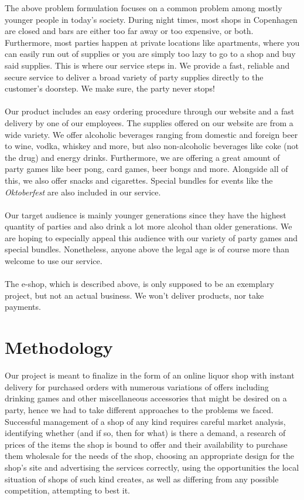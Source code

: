 \documentclass[12p]{article}
\begin{document}
The above problem formulation focuses on a common problem among mostly younger people in today's society. During night times, most shops in Copenhagen are closed and bars are either too far away or too expensive, or both. Furthermore, most parties happen at private locations like apartments, where you can easily run out of supplies or you are simply too lazy to go to a shop and buy said supplies. This is where our service steps in. We provide a fast, reliable and secure service to deliver a broad variety of party supplies directly to the customer's doorstep. We make sure, the party never stops! 
\\ \\
Our product includes an easy ordering procedure through our website and a fast delivery by one of our employees. The supplies offered on our website are from a wide variety. We offer alcoholic beverages ranging from domestic and foreign beer to wine, vodka, whiskey and more, but also non-alcoholic beverages like coke (not the drug) and energy drinks. Furthermore, we are offering a great amount of party games like beer pong, card games, beer bongs and more. Alongside all of this, we also offer snacks and cigarettes. Special bundles for events like the \emph{Oktoberfest} are also included in our service.
\\ \\
Our target audience is mainly younger generations since they have the highest quantity of parties and also drink a lot more alcohol than older generations. We are hoping to especially appeal this audience with our variety of party games and special bundles. Nonetheless, anyone above the legal age is of course more than welcome to use our service.
\\ \\
The e-shop, which is described above, is only supposed to be an exemplary project, but not an actual business. We won't deliver products, nor take payments.


\newpage
\section{Methodology} \label{Methodology}
Our project is meant to finalize in the form of an online liquor shop with instant delivery for purchased orders with numerous variations of offers including drinking games and other miscellaneous accessories that might be desired on a party, hence we had to take different approaches to the problems we faced. Successful management of a shop of any kind requires careful market analysis, identifying whether (and if so, then for what) is there a demand, a research of prices of the items the shop is bound to offer and their availability to purchase them wholesale for the needs of the shop, choosing an appropriate design for the shop’s site and advertising the services correctly, using the opportunities the local situation of shops of such kind creates, as well as differing from any possible competition, attempting to best it. 
\end{document}

